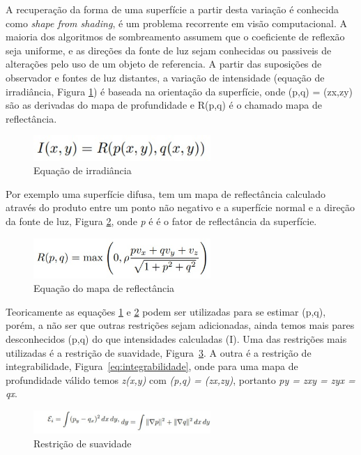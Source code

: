 \documentclass{article}
\begin{document}
A recuperação da forma de uma superfície a partir desta variação é conhecida como \textit{shape from shading}, é um problema recorrente em visão computacional.
A maioria dos algoritmos de sombreamento assumem que o coeficiente de reflexão seja uniforme, e as direções da fonte de luz sejam conhecidas ou passiveis de alterações pelo uso de um objeto de referencia. A partir das suposições de observador e fontes de luz distantes, a variação de intensidade (equação de irradiância, Figura \ref{eq:irrad}) é baseada na orientação da superfície, onde (p,q) = (zx,zy) são as derivadas do mapa de profundidade e R(p,q) é o chamado mapa de reflectância.

\begin{figure}[!htb]
    \centering
    \includegraphics[width=0.60\textwidth]{equacao1.jpg}
    \caption{Equação de irradiância}
    \label{eq:irrad}
\end{figure}

Por exemplo uma superfície difusa, tem um mapa de reflectância calculado através do produto entre um ponto não negativo e a superfície normal e a direção da fonte de luz, Figura \ref{eq:mapareflec}, onde \textit{p} é é o fator de reflectância da superfície.

\begin{figure}[!htb]
    \centering
    \includegraphics[width=0.60\textwidth]{equacao2.jpg}
    \caption{Equação do mapa de reflectância}
    \label{eq:mapareflec}
\end{figure}

Teoricamente as equações \ref{eq:irrad} e \ref{eq:mapareflec} podem ser utilizadas para se estimar (p,q), porém,  a não ser que outras restrições sejam adicionadas, ainda temos mais pares desconhecidos (p,q) do que intensidades calculadas (I). Uma das restrições mais utilizadas é a restrição de suavidade, Figura~\ref{eq:suavidade}. A outra é a restrição de integrabilidade, Figura~\ref{eq:integrabilidade}, onde para uma mapa de profundidade válido temos \textit{z(x,y)} com \textit{(p,q) = (zx,zy)}, portanto \textit{py = zxy = zyx = qx}.

\begin{figure}[!htb]
    \centering
    \includegraphics[width=0.60\textwidth]{equacao3.jpg}
    \caption{Restrição de suavidade}
    \label{eq:suavidade}
\end{figure}
\end{document}
